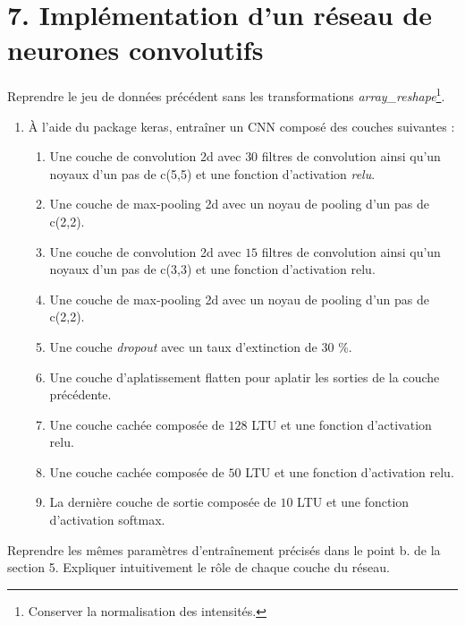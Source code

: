 \documentclass[11pt,]{article}
\begin{document}
\hypertarget{implementation-dun-reseau-de-neurones-convolutifs}{%
\section{7. Implémentation d'un réseau de neurones
convolutifs}\label{implementation-dun-reseau-de-neurones-convolutifs}}

Reprendre le jeu de données précédent sans les transformations
\emph{array\_reshape}\footnote{Conserver la normalisation des
  intensités.}.

\begin{enumerate}
\def\labelenumi{\arabic{enumi}.}
\setcounter{enumi}{4}
\item
  À l'aide du package \textsf{keras}, entraîner un CNN composé des
  couches suivantes :

  \begin{enumerate}
  \def\labelenumii{\arabic{enumii}.}
  \item
    Une couche de convolution 2d avec \(30\) filtres de convolution
    ainsi qu'un noyaux d'un pas de \textsf{c(5,5)} et une fonction
    d'activation \emph{relu}.
  \item
    Une couche de max-pooling 2d avec un noyau de pooling d'un pas de
    \textsf{c(2,2)}.
  \item
    Une couche de convolution 2d avec \(15\) filtres de convolution
    ainsi qu'un noyaux d'un pas de \textsf{c(3,3)} et une fonction
    d'activation \textsf{relu}.
  \item
    Une couche de max-pooling 2d avec un noyau de pooling d'un pas de
    \textsf{c(2,2)}.
  \item
    Une couche \emph{dropout} avec un taux d'extinction de \(30\) \%.
  \item
    Une couche d'aplatissement \textsf{flatten} pour aplatir les sorties
    de la couche précédente.
  \item
    Une couche cachée composée de \(128\) LTU et une fonction
    d'activation \textsf{relu}.
  \item
    Une couche cachée composée de \(50\) LTU et une fonction
    d'activation \textsf{relu}.
  \item
    La dernière couche de sortie composée de \(10\) LTU et une fonction
    d'activation \textsf{softmax}.
  \end{enumerate}
\end{enumerate}

Reprendre les mêmes paramètres d'entraînement précisés dans le point b.
de la section 5. Expliquer intuitivement le rôle de chaque couche du
réseau.
\end{document}
